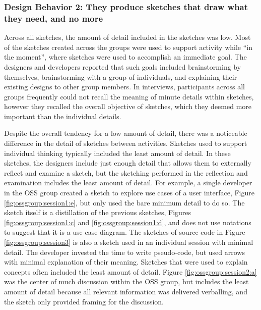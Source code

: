 
\subsubsection{Design Behavior 2: They produce sketches that draw what they need, and no more}

Across all sketches, the amount of detail included in the sketches was low. Most of the sketches created across the groups were used to support activity while ``in the moment'', where sketches were used to accomplish an immediate goal. The designers and developers reported that such goals included brainstorming by themselves, brainstorming with a group of individuals, and explaining their existing designs to other group members. In interviews, participants across all groups frequently could not recall the meaning of minute details within sketches, however they recalled the overall objective of sketches, which they deemed more important than the individual details. 

Despite the overall tendency for a low amount of detail, there was a noticeable difference in the detail of sketches between activities. Sketches used to support individual thinking typically included the least amount of detail. In these sketches, the designers include just enough detail that allows them to externally reflect and examine a sketch, but the sketching performed in the reflection and examination includes the least amount of detail. For example, a single developer in the OSS group created a sketch to explore use cases of a user interface, Figure \ref{fig:ossgroup:session1:e}, but only used the bare minimum detail to do so. The sketch itself is a distillation of the previous sketches, Figures \ref{fig:ossgroup:session1:c} and \ref{fig:ossgroup:session1:d}, and does not use notations to suggest that it is a use case diagram. The sketches of source code in Figure \ref{fig:ossgroup:session3} is also a sketch used in an individual session with minimal detail. The developer invested the time to write pseudo-code, but used arrows with minimal explanation of their meaning. Sketches that were used to explain concepts often included the least amount of detail. Figure \ref{fig:ossgroup:session2:a} was the center of much discussion within the OSS group, but includes the least amount of detail because all relevant information was delivered verballing, and the sketch only provided framing for the discussion.

